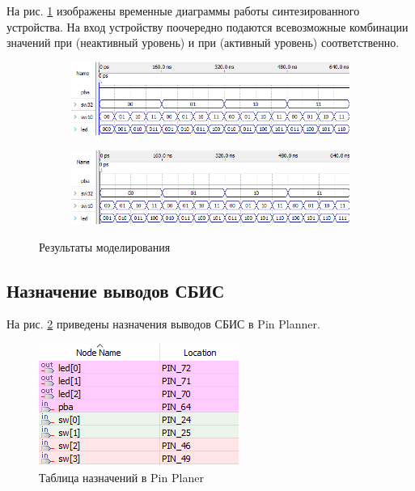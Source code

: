 На рис. \ref{fig:elab1_3_modeling} изображены временные диаграммы работы синтезированного устройства. На вход устройству поочередно подаются всевозможные комбинации значений  при  (неактивный уровень) и при  (активный уровень) соответственно.
\begin{figure}[H]
\begin{center}
	\begin{subfigure}[b]{\textwidth}
		\includegraphics[width=\textwidth]{elab1_3_modeling_1}
	\end{subfigure}
	\begin{subfigure}[b]{\textwidth}
		\includegraphics[width=\textwidth]{elab1_3_modeling_2}
	\end{subfigure}
	\caption{Результаты моделирования}
	\label{fig:elab1_3_modeling}
\end{center}
\end{figure}

\subsection{Назначение выводов СБИС}

На рис. \ref{fig:elab1_3_pins} приведены назначения выводов СБИС в Pin Planner.

\begin{figure}[H]
\begin{center}
	\includegraphics{elab1_3_pins}
	\caption{Таблица назначений в Pin Planer}
	\label{fig:elab1_3_pins}
\end{center}
\end{figure}

